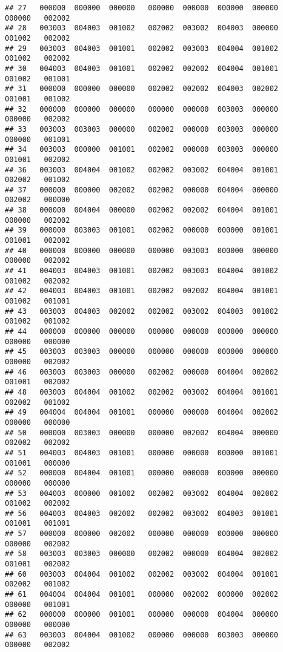 \documentclass[
]{article}
\begin{document}
\begin{verbatim}
## 27   000000  000000  000000   000000  000000  000000  000000   000000   002002
## 28   003003  004003  001002   002002  003002  004003  000000   001002   002002
## 29   003003  004003  001001   002002  003003  004004  001002   001002   002002
## 30   004003  004003  001001   002002  002002  004004  001001   001002   001001
## 31   000000  000000  000000   002002  002002  004003  002002   001001   001002
## 32   000000  000000  000000   000000  000000  003003  000000   000000   002002
## 33   003003  003003  000000   002002  000000  003003  000000   000000   001001
## 34   003003  000000  001001   002002  000000  003003  000000   001001   002002
## 36   003003  004004  001002   002002  003002  004004  001001   002002   001002
## 37   000000  000000  002002   002002  000000  004004  000000   002002   000000
## 38   000000  004004  000000   002002  002002  004004  001001   000000   002002
## 39   000000  003003  001001   002002  000000  000000  001001   001001   002002
## 40   000000  000000  000000   000000  003003  000000  000000   000000   002002
## 41   004003  004003  001001   002002  003003  004004  001002   001002   002002
## 42   004003  004003  001001   002002  002002  004004  001001   001002   001001
## 43   003003  004003  002002   002002  003002  004003  001002   001002   001002
## 44   000000  000000  000000   000000  000000  000000  000000   000000   000000
## 45   003003  003003  000000   000000  000000  000000  000000   000000   002002
## 46   003003  003003  000000   002002  000000  004004  002002   001001   002002
## 48   003003  004004  001002   002002  003002  004004  001001   002002   001002
## 49   004004  004004  001001   000000  000000  004004  002002   000000   000000
## 50   000000  003003  000000   000000  002002  004004  000000   002002   002002
## 51   004003  004003  001001   000000  000000  000000  001001   001001   000000
## 52   000000  004004  001001   000000  000000  000000  000000   000000   000000
## 53   004003  000000  001002   002002  003002  004004  002002   001002   002002
## 56   004003  004003  002002   002002  003002  004003  001001   001001   001001
## 57   000000  000000  002002   000000  000000  000000  000000   000000   002002
## 58   003003  003003  000000   002002  000000  004004  002002   001001   002002
## 60   003003  004004  001002   002002  003002  004004  001001   002002   001002
## 61   004004  004004  001001   000000  002002  000000  002002   000000   001001
## 62   000000  000000  001001   000000  000000  004004  000000   000000   000000
## 63   003003  004004  001002   000000  000000  003003  000000   000000   002002

\end{verbatim}
\end{document}
